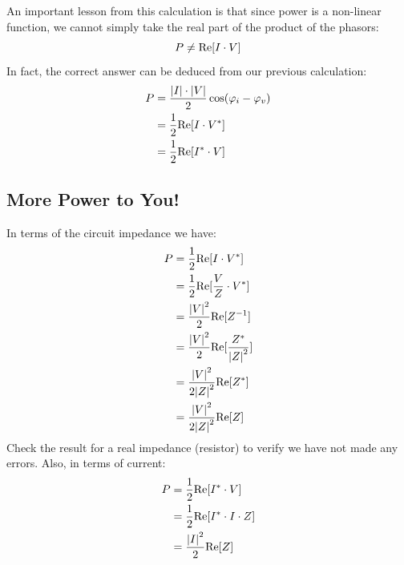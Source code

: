 \vspace{0.25cm}
\noindent
An important lesson from this calculation is that since power is a non-linear function, we cannot simply take the real part of the product of the phasors:
    \begin{equation}
        P \ne {\mathop{\rm Re}\nolimits} [I \cdot V]
    \end{equation}
In fact, the correct answer can be deduced from our previous calculation:
    \begin{align*}
        P &= \frac{{\left| I \right| \cdot \left| V \right|}}{2}\cos ({\varphi _i} - {\varphi _v})\\
        &= \frac{1}{2}{\mathop{\rm Re}\nolimits} [I \cdot {V^*}]\\
        &= \frac{1}{2}{\mathop{\rm Re}\nolimits} [{I^*} \cdot V]
    \end{align*}
\subsection{More Power to You!}
In terms of the circuit impedance we have:
    \begin{align*}
        P &= \frac{1}{2}{\mathop{\rm Re}\nolimits} [I \cdot {V^*}]\\
        &= \frac{1}{2}{\mathop{\rm Re}\nolimits} [\frac{V}{Z} \cdot {V^*}]\\
        &= \frac{{{{\left| V \right|}^2}}}{2}{\mathop{\rm Re}\nolimits} [{Z^{ - 1}}]\\
        &= \frac{{{{\left| V \right|}^2}}}{2}{\mathop{\rm Re}\nolimits} [\frac{{{Z^*}}}{{{{\left| Z \right|}^2}}}]\\
        &= \frac{{{{\left| V \right|}^2}}}{{2{{\left| Z \right|}^2}}}{\mathop{\rm Re}\nolimits} [{Z^*}]\\
        &= \frac{{{{\left| V \right|}^2}}}{{2{{\left| Z \right|}^2}}}{\mathop{\rm Re}\nolimits} [Z]
    \end{align*}
Check the result for a real impedance (resistor) to verify we have not made any errors.   Also, in terms of current:
    \begin{align*}
        P &= \frac{1}{2}{\mathop{\rm Re}\nolimits} [{I^*} \cdot V]\\
        &= \frac{1}{2}{\mathop{\rm Re}\nolimits} [{I^*} \cdot I \cdot Z]\\
        &= \frac{{{{\left| I \right|}^2}}}{2}{\mathop{\rm Re}\nolimits} [Z]
    \end{align*}
\newpage
